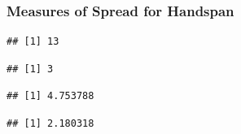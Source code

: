 %
\begin{frame}[fragile]
  \frametitle{Measures of Spread for Handspan}

  \small
\begin{knitrout}
\color{fgcolor}\begin{kframe}
\begin{alltt}
\hlstd{(}\hlopt{$}  \hlstd{=} \hlstd{))}
\end{alltt}
\begin{verbatim}
## [1] 13
\end{verbatim}
\begin{alltt}
\hlopt{$}  \hlstd{=} \hlstd{)}
\end{alltt}
\begin{verbatim}
## [1] 3
\end{verbatim}
\begin{alltt}
\hlopt{$}  \hlstd{=} \hlstd{)}
\end{alltt}
\begin{verbatim}
## [1] 4.753788
\end{verbatim}
\begin{alltt}
\hlopt{$}  \hlstd{=} \hlstd{)}
\end{alltt}
\begin{verbatim}
## [1] 2.180318
\end{verbatim}
\end{kframe}
\end{knitrout}
\end{frame}


